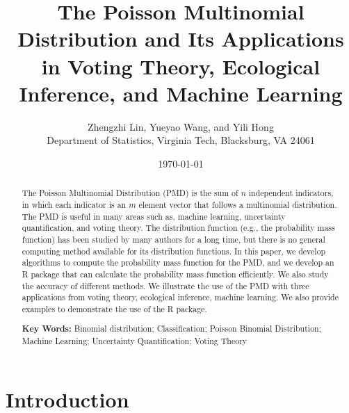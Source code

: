 \documentclass[12pt]{article}
\begin{document}


\title{The Poisson Multinomial Distribution and Its Applications in Voting Theory, Ecological Inference, and Machine Learning}


\author{
Zhengzhi Lin, Yueyao Wang, and Yili Hong\\[1.5ex]
{Department of Statistics, Virginia Tech, Blacksburg, VA 24061}
}
	
\date{\today}
	
\maketitle
\begin{abstract}
The Poisson Multinomial Distribution (PMD) is the sum of $n$ independent indicators, in which each indicator is an $m$ element vector that follows a multinomial distribution. The PMD is useful in many areas such as, machine learning, uncertainty quantification, and voting theory. The distribution function (e.g., the probability mass function) has been studied by many authors for a long time, but there is no general computing method available for its distribution functions. In this paper, we develop algorithms to compute the probability mass function for the PMD, and we develop an R package that can calculate the probability mass function efficiently. We also study the accuracy of different methods. We illustrate the use of the PMD with three applications from voting theory, ecological inference, machine learning. We also provide examples to demonstrate the use of the R package.
		
\textbf{Key Words:} Binomial distribution; Classification; Poisson Binomial Distribution; Machine Learning; Uncertainty Quantification;  Voting Theory
\end{abstract}
	
\newpage
	
\section{Introduction}
\end{document}
